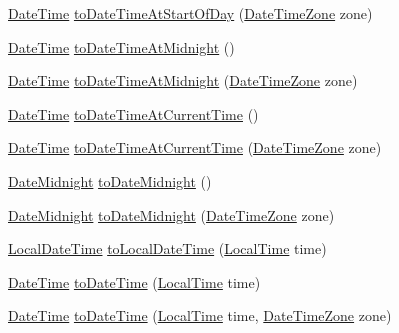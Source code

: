 \begin{DoxyCompactItemize}
\hyperlink{classorg_1_1joda_1_1time_1_1_date_time}{Date\-Time} \hyperlink{classorg_1_1joda_1_1time_1_1_local_date_afe288db1a2ca49a6532682c5a917ad41}{to\-Date\-Time\-At\-Start\-Of\-Day} (\hyperlink{classorg_1_1joda_1_1time_1_1_date_time_zone}{Date\-Time\-Zone} zone)
\item 
\hyperlink{classorg_1_1joda_1_1time_1_1_date_time}{Date\-Time} \hyperlink{classorg_1_1joda_1_1time_1_1_local_date_adfba25c6eecf7a2ab6b38bb31aa7b4a3}{to\-Date\-Time\-At\-Midnight} ()
\item 
\hyperlink{classorg_1_1joda_1_1time_1_1_date_time}{Date\-Time} \hyperlink{classorg_1_1joda_1_1time_1_1_local_date_a0e9631daef31c0cff6fee24c838a5c08}{to\-Date\-Time\-At\-Midnight} (\hyperlink{classorg_1_1joda_1_1time_1_1_date_time_zone}{Date\-Time\-Zone} zone)
\item 
\hyperlink{classorg_1_1joda_1_1time_1_1_date_time}{Date\-Time} \hyperlink{classorg_1_1joda_1_1time_1_1_local_date_aec37a2c56992f8d84a3d875d7b4783a4}{to\-Date\-Time\-At\-Current\-Time} ()
\item 
\hyperlink{classorg_1_1joda_1_1time_1_1_date_time}{Date\-Time} \hyperlink{classorg_1_1joda_1_1time_1_1_local_date_aa1e211ac172a5af7d26c6a7204f86a6e}{to\-Date\-Time\-At\-Current\-Time} (\hyperlink{classorg_1_1joda_1_1time_1_1_date_time_zone}{Date\-Time\-Zone} zone)
\item 
\hyperlink{classorg_1_1joda_1_1time_1_1_date_midnight}{Date\-Midnight} \hyperlink{classorg_1_1joda_1_1time_1_1_local_date_a4330474a2517c4cb5eebd4d403de5a2e}{to\-Date\-Midnight} ()
\item 
\hyperlink{classorg_1_1joda_1_1time_1_1_date_midnight}{Date\-Midnight} \hyperlink{classorg_1_1joda_1_1time_1_1_local_date_a77df4e770b2d6e8eb14e8bc492a074a1}{to\-Date\-Midnight} (\hyperlink{classorg_1_1joda_1_1time_1_1_date_time_zone}{Date\-Time\-Zone} zone)
\item 
\hyperlink{classorg_1_1joda_1_1time_1_1_local_date_time}{Local\-Date\-Time} \hyperlink{classorg_1_1joda_1_1time_1_1_local_date_a932fabf9d0a6c48b366f2128de3b2f46}{to\-Local\-Date\-Time} (\hyperlink{classorg_1_1joda_1_1time_1_1_local_time}{Local\-Time} time)
\item 
\hyperlink{classorg_1_1joda_1_1time_1_1_date_time}{Date\-Time} \hyperlink{classorg_1_1joda_1_1time_1_1_local_date_ae7495ed89a524605c56fea3108b0d31f}{to\-Date\-Time} (\hyperlink{classorg_1_1joda_1_1time_1_1_local_time}{Local\-Time} time)
\item 
\hyperlink{classorg_1_1joda_1_1time_1_1_date_time}{Date\-Time} \hyperlink{classorg_1_1joda_1_1time_1_1_local_date_a7a9ec20f43891cfe73fb312bcc6a9c12}{to\-Date\-Time} (\hyperlink{classorg_1_1joda_1_1time_1_1_local_time}{Local\-Time} time, \hyperlink{classorg_1_1joda_1_1time_1_1_date_time_zone}{Date\-Time\-Zone} zone)

\end{DoxyCompactItemize}
